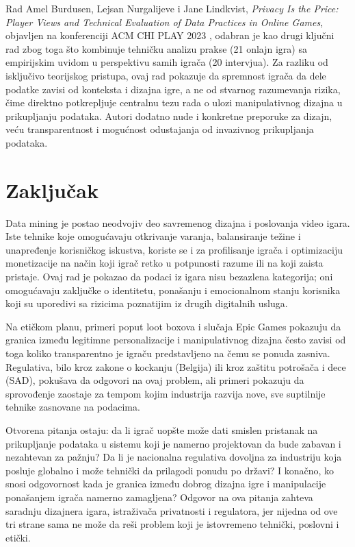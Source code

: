 \documentclass[12pt]{article}
\begin{document}
Rad Amel Burdusen, Lejsan Nurgalijeve i Jane Lindkvist, \textit{Privacy Is the Price: Player Views and Technical Evaluation of Data Practices in Online Games}, objavljen na konferenciji ACM CHI PLAY 2023 \cite{bourdoucen2023}, odabran je kao drugi ključni rad zbog toga što kombinuje tehničku analizu prakse (21 onlajn igra) sa empirijskim uvidom u perspektivu samih igrača (20 intervjua). Za razliku od isključivo teorijskog pristupa, ovaj rad pokazuje da spremnost igrača da dele podatke zavisi od konteksta i dizajna igre, a ne od stvarnog razumevanja rizika, čime direktno potkrepljuje centralnu tezu rada o ulozi manipulativnog dizajna u prikupljanju podataka. Autori dodatno nude i konkretne preporuke za dizajn, veću transparentnost i mogućnost odustajanja od invazivnog prikupljanja podataka.

\section{Zaključak}

Data mining je postao neodvojiv deo savremenog dizajna i poslovanja video igara. Iste tehnike koje omogućavaju otkrivanje varanja, balansiranje težine i unapređenje korisničkog iskustva, koriste se i za profilisanje igrača i optimizaciju monetizacije na način koji igrač retko u potpunosti razume ili na koji zaista pristaje. Ovaj rad je pokazao da podaci iz igara nisu bezazlena kategorija; oni omogućavaju zaključke o identitetu, ponašanju i emocionalnom stanju korisnika koji su uporedivi sa rizicima poznatijim iz drugih digitalnih usluga.

Na etičkom planu, primeri poput loot boxova i slučaja Epic Games pokazuju da granica između legitimne personalizacije i manipulativnog dizajna često zavisi od toga koliko transparentno je igraču predstavljeno na čemu se ponuda zasniva. Regulativa, bilo kroz zakone o kockanju (Belgija) ili kroz zaštitu potrošača i dece (SAD), pokušava da odgovori na ovaj problem, ali primeri pokazuju da sprovođenje zaostaje za tempom kojim industrija razvija nove, sve suptilnije tehnike zasnovane na podacima.

Otvorena pitanja ostaju: da li igrač uopšte može dati smislen pristanak na prikupljanje podataka u sistemu koji je namerno projektovan da bude zabavan i nezahtevan za pažnju? Da li je nacionalna regulativa dovoljna za industriju koja posluje globalno i može tehnički da prilagodi ponudu po državi? I konačno, ko snosi odgovornost kada je granica između dobrog dizajna igre i manipulacije ponašanjem igrača namerno zamagljena? Odgovor na ova pitanja zahteva saradnju dizajnera igara, istraživača privatnosti i regulatora, jer nijedna od ove tri strane sama ne može da reši problem koji je istovremeno tehnički, poslovni i etički.
\end{document}

